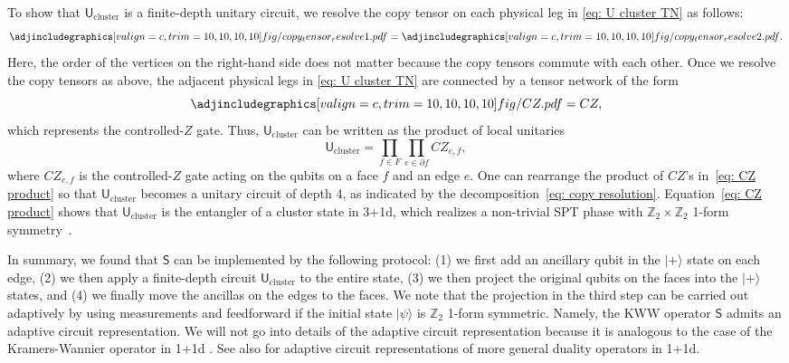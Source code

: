 \documentclass[aps,twocolumn,prx,floatfix,preprintnumbers, nofootinbib,10pt]{revtex4-2}
\numberwithin{equation}{section}
\theoremstyle{definition}
\theoremstyle{remark}
\theoremstyle{claim}
\def\ket#1{{|{#1}\rangle}}
\renewcommand{\sf}[1]{\mathsf{#1}}
\begin{document}
To show that $\sf{U}_{\mathrm{cluster}}$ is a finite-depth unitary circuit, we resolve the copy tensor on each physical leg in \eqref{eq: U cluster TN} as follows:
\begin{equation}
\adjincludegraphics[valign=c, trim={10, 10, 10, 10}]{fig/copy_tensor_resolve1.pdf} = \adjincludegraphics[valign=c, trim={10, 10, 10, 10}]{fig/copy_tensor_resolve2.pdf}.
\label{eq: copy resolution}
\end{equation}
Here, the order of the vertices on the right-hand side does not matter because the copy tensors commute with each other.
Once we resolve the copy tensors as above, the adjacent physical legs in \eqref{eq: U cluster TN} are connected by a tensor network of the form
\begin{equation}
\adjincludegraphics[valign=c, trim={10, 10, 10, 10}]{fig/CZ.pdf} = CZ,
\end{equation}
which represents the controlled-$Z$ gate.
Thus, $\sf{U}_{\mathrm{cluster}}$ can be written as the product of local unitaries
\begin{equation}
\sf{U}_{\mathrm{cluster}} = \prod_{f \in F} \prod_{e \in \partial f} CZ_{e, f},
\label{eq: CZ product}
\end{equation}
where $CZ_{e, f}$ is the controlled-$Z$ gate acting on the qubits on a face $f$ and an edge $e$.
One can rearrange the product of $CZ$'s in~\eqref{eq: CZ product} so that $\sf{U}_{\mathrm{cluster}}$ becomes a unitary circuit of depth 4, as indicated by the decomposition~\eqref{eq: copy resolution}.
Equation~\eqref{eq: CZ product} shows that $\sf{U}_{\mathrm{cluster}}$ is the entangler of a cluster state in 3+1d, which realizes a non-trivial SPT phase with $\mathbb{Z}_2 \times \mathbb{Z}_2$ 1-form symmetry~\cite{Yoshida:2015cia}.

In summary, we found that $\mathsf{S}$ can be implemented by the following protocol: (1) we first add an ancillary qubit in the $\ket{+}$ state on each edge, (2) we then apply a finite-depth circuit $\sf{U}_{\mathrm{cluster}}$ to the entire state, (3) we then project the original qubits on the faces into the $\ket{+}$ states, and (4) we finally move the ancillas on the edges to the faces.
We note that the projection in the third step can be carried out adaptively by using measurements and feedforward if the initial state $\ket{\psi}$ is $\mathbb{Z}_2$ 1-form symmetric.
Namely, the KWW operator $\mathsf{S}$ admits an adaptive circuit representation.
We will not go into details of the adaptive circuit representation because it is analogous to the case of the Kramers-Wannier operator in 1+1d \cite{Tantivasadakarn:2021vel}.
See also \cite{Lootens:2023wnl} for adaptive circuit representations of more general duality operators in 1+1d.
\end{document}
